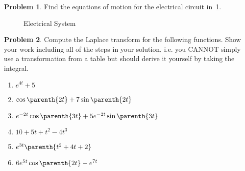 \documentclass[10pt]{article}
\theoremstyle{definition}
\newtheorem{prob}{Problem}[section]
\newenvironment{subprob}%
{\renewcommand{\theenumi}{\alph{enumi}}\renewcommand{\labelenumi}{(\theenumi)}\begin{enumerate}}%
{\end{enumerate}}%
\begin{document}
\begin{prob}
    Find the equations of motion for the electrical circuit in~\cref{fig:electrical}.
    \begin{figure}[h]
        \centering
        \begin{scaletikzpicturetowidth}{0.3\textwidth}
        \end{scaletikzpicturetowidth}
    \caption{Electrical System~\label{fig:electrical}}
    \end{figure}
\end{prob}
\begin{prob}
    Compute the Laplace transform for the following functions.
    Show your work including all of the steps in your solution, i.e. you CANNOT simply use a transformation from a table but should derive it yourself by taking the integral.
    \begin{subprob}
        \item \( e^{4 t} + 5 \)
        \item \( \cos\parenth{2t} + 7 \sin\parenth{2t} \)
        \item \( e^{-2 t} \cos\parenth{3t} + 5 e^{-2t}\sin\parenth{3t}\)
        \item \( 10 + 5 t + t^2 - 4 t^3\)
        \item \( e^{3t} \parenth{t^2 + 4t + 2}\)
        \item \( 6 e^{5t} \cos\parenth{2t} - e^{7t}\)
    \end{subprob}
\end{prob}
\end{document}
